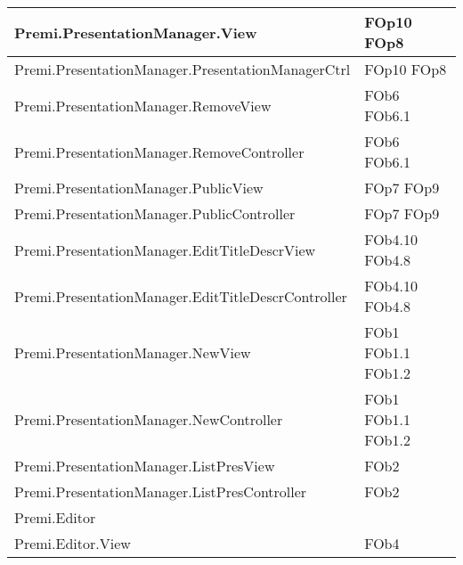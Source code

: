 \begin{longtable}{|p{10cm}|p{4cm}|}
\hline
Premi.PresentationManager.View & FOp10 \linebreak FOp8 \linebreak \\
\hline
Premi.PresentationManager.PresentationManagerCtrl & FOp10 \linebreak FOp8 \linebreak \\
\hline
Premi.PresentationManager.RemoveView & FOb6 \linebreak FOb6.1 \linebreak \\
\hline
Premi.PresentationManager.RemoveController & FOb6 \linebreak FOb6.1 \linebreak \\
\hline
Premi.PresentationManager.PublicView & FOp7 \linebreak FOp9 \linebreak \\
\hline
Premi.PresentationManager.PublicController & FOp7 \linebreak FOp9 \linebreak \\
\hline
Premi.PresentationManager.EditTitleDescrView & FOb4.10 \linebreak FOb4.8 \linebreak \\
\hline
Premi.PresentationManager.EditTitleDescrController & FOb4.10 \linebreak FOb4.8 \linebreak \\
\hline
Premi.PresentationManager.NewView & FOb1 \linebreak FOb1.1 \linebreak FOb1.2 \linebreak \\
\hline
Premi.PresentationManager.NewController & FOb1 \linebreak FOb1.1 \linebreak FOb1.2 \linebreak \\
\hline
Premi.PresentationManager.ListPresView & FOb2 \linebreak \\
\hline
Premi.PresentationManager.ListPresController & FOb2 \linebreak \\
\hline
Premi.Editor & \\
\hline
Premi.Editor.View & FOb4 \linebreak \\

\end{longtable}

